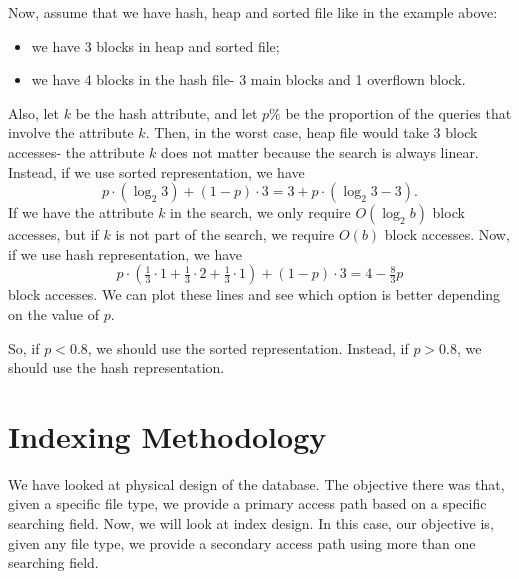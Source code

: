 \documentclass[a4paper, openany]{memoir}
\begin{document}
Now, assume that we have hash, heap and sorted file like in the example above:
\begin{itemize}
    \item we have 3 blocks in heap and sorted file;
    \item we have 4 blocks in the hash file- 3 main blocks and 1 overflown block.
\end{itemize}
Also, let $k$ be the hash attribute, and let $p\%$ be the proportion of the queries that involve the attribute $k$. Then, in the worst case, heap file would take 3 block accesses- the attribute $k$ does not matter because the search is always linear. Instead, if we use sorted representation, we have
\[p \cdot (\log_2 3) + (1 - p) \cdot 3 = 3 + p \cdot (\log_2 3 - 3).\]
If we have the attribute $k$ in the search, we only require $O(\log_2 b)$ block accesses, but if $k$ is not part of the search, we require $O(b)$ block accesses. Now, if we use hash representation, we have
\[p \cdot (\tfrac{1}{3} \cdot 1 + \tfrac{1}{3} \cdot 2 + \tfrac{1}{3} \cdot 1) + (1 - p) \cdot 3 = 4 - \tfrac{8}{3} p\]
block accesses. We can plot these lines and see which option is better depending on the value of $p$.
\begin{figure}[H]
    \centering
\end{figure}
\noindent So, if $p < 0.8$, we should use the sorted representation. Instead, if $p > 0.8$, we should use the hash representation.

\newpage

\section{Indexing Methodology}
We have looked at physical design of the database. The objective there was that, given a specific file type, we provide a primary access path based on a specific searching field. Now, we will look at index design. In this case, our objective is, given any file type, we provide a secondary access path using more than one searching field. 
\end{document}
